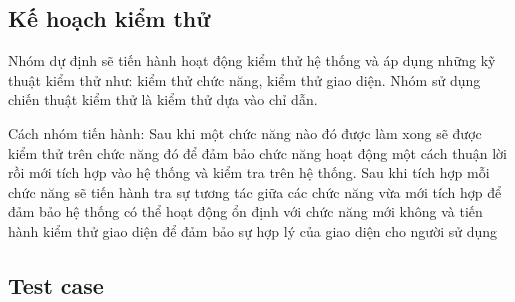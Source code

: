 \documentclass[a4paper, 12pt]{article}
\begin{document}
\subsection{Kế hoạch kiểm thử}
Nhóm dự định sẽ tiến hành hoạt động kiểm thử hệ thống và áp dụng những kỹ thuật kiểm thử như: kiểm thử chức năng, kiểm thử giao diện. Nhóm sử dụng chiến thuật kiểm thử là kiểm thử dựa vào chỉ dẫn. 

Cách nhóm tiến hành: Sau khi một chức năng nào đó được làm xong sẽ được kiểm thử trên chức năng đó để đảm bảo chức năng hoạt động một cách thuận lời rồi mới tích hợp vào hệ thống và kiểm tra trên hệ thống. Sau khi tích hợp mỗi chức năng sẽ tiến hành tra sự tương tác giữa các chức năng vừa mới tích hợp để đảm bảo hệ thống có thể hoạt động ổn định với chức năng mới không và tiến hành kiểm thử giao diện để đảm bảo sự hợp lý của giao diện cho người sử dụng

	
\subsection{Test case}
\end{document}
